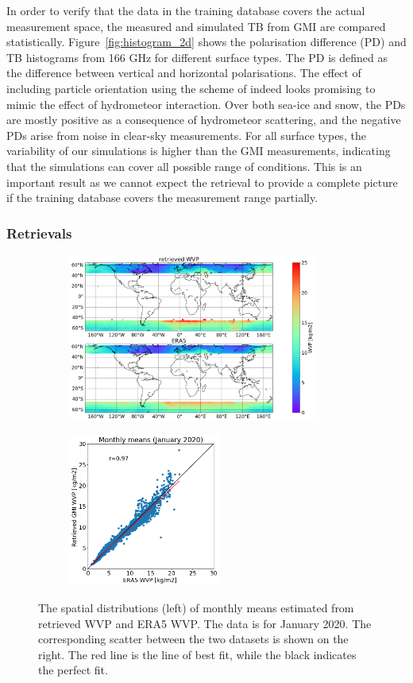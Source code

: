 \documentclass[12pt,oneside,a4paper]{article}
\begin{document}
In order to verify that the data in the training database covers the actual measurement space, the measured and simulated TB from GMI are compared statistically. Figure~\ref{fig:histogram_2d} shows the polarisation difference (PD) and TB histograms from 166 GHz for different surface types. The PD is defined as the difference between vertical and horizontal polarisations. The effect of including particle orientation using the scheme of \citet{baralakas:intro:21} indeed looks promising to mimic the effect of hydrometeor interaction.
Over both sea-ice and snow, the PDs are mostly positive as a consequence of hydrometeor scattering, and the negative PDs arise from noise in clear-sky measurements. For all surface types, the variability of our simulations is higher than the GMI measurements, indicating that the simulations can cover all possible range of conditions. This is an important result as we cannot expect the retrieval to provide a complete picture if the training database covers the measurement range partially.

\subsubsection{Retrievals}
\label{sec:preliminary_results}
\begin{figure}[t]
	\centering
	\begin{subfigure}{.54\textwidth}
		\includegraphics[height = 55mm]{Figures/WVP_spatial_jan2020.png}
	\end{subfigure}
	\begin{subfigure}{.34\textwidth}
	\includegraphics[height = 50mm]{Figures/WVP_scatter_monthlymean.png} 
	\end{subfigure}
	\caption{The spatial distributions (left) of monthly means estimated from retrieved WVP and ERA5 WVP. The data is for January 2020. The corresponding scatter between the two datasets is shown on the right. The red line is the line of best fit, while the black indicates the perfect fit.}
	\label{fig:WVP_retrievals}
\end{figure}
\end{document}
